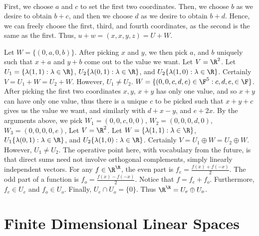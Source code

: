 \documentclass{book}
\begin{document}
\begin{enumerate}[label=\arabic*)]
\begin{align*}
      \end{align*}
      First, we choose $a$ and $c$ to set the first two coordinates. Then, we choose $b$ as we desire to obtain $b + c$, and then we choose $d$ as we desire to obtain $b + d$.
      Hence, we can freely choose the first, third, and fourth coordinates, as the second is the same as the first. Thus, $u + w = (x, x, y, z) = U + W$.
    \addtocounter{enumi}{4}
    \ii
      Let $W = \{(0, a, 0, b)\}$. After picking $x$ and $y$, we then pick $a$, and $b$ uniquely such that $x + a$ and $y + b$ come out to the value we want.
    \ii
      Let $V = \R^2$. Let $U_1 = \{\lambda(1, 1): \lambda \in \R\}$, $U_2 \{\lambda(0, 1): \lambda \in \R\}$, and $U_2 \{\lambda(1, 0): \lambda \in \R\}$. Certainly $V =
      U_1 + W = U_2 + W$. However, $U_1 \neq U_2$.
    \ii
      $W = \{(0, 0, c, d, e) \in \F^5: c, d, e, \in \F\}$. After picking the first two coordinates $x, y$, $x + y$ has only one value, and so $x + y$ can have only one value,
      thus there is a unique $c$ to be picked such that $x + y + c$ gives us the value we want, and similarly with $d + x - y$, and $e + 2x$.
    \ii
      By the arguments above, we pick $W_1 = (0, 0, c, 0, 0)$, $W_2 = (0, 0, 0, d, 0)$, $W_3 = (0, 0, 0, 0, e)$, 
    \ii 
      Let $V = \R^2$. Let $W = \{\lambda(1, 1): \lambda \in \R\}$, $U_1 \{\lambda(0, 1): \lambda \in \R\}$, and $U_2 \{\lambda(1, 0): \lambda \in \R\}$. Certainly $V =
      U_1 \oplus W = U_2 \oplus W$. However, $U_1 \neq U_2$. The operative point here, with vocabulary from the future, is that direct sums need not involve orthogonal
      complements, simply linearly independent vectors.
    \ii 
      For any $f \in \R^\R$, the even part is $f_e = \frac{f(x) + f(-x)}{2}$. The odd part of a function is $f_o = \frac{f(x) - f(-x)}{2}$. Notice that $f = f_e + f_o$.
      Furthermore, $f_e \in U_e$ and $f_o \in U_o$. Finally, $U_e \cap U_o = \{0\}$. Thus $\R^\R = U_e \oplus U_o$.
  \end{enumerate}
\chapter{Finite Dimensional Linear Spaces}
\end{document}
